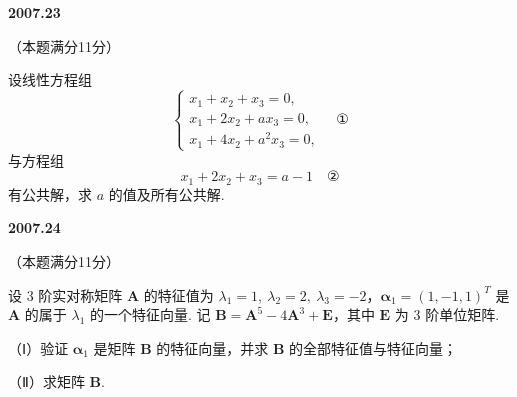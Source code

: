 \documentclass[UTF8,12pt,fontset=windows]{ctexart}
\begin{document}
\vfill
\newpage
{\large\bfseries 2007.23}

（本题满分11分）

设线性方程组
$$\begin{cases} x_1 + x_2 + x_3 = 0, \\ x_1 + 2x_2 + ax_3 = 0, \\ x_1 + 4x_2 + a^2x_3 = 0, \end{cases} \quad \text{①}$$
与方程组
$$x_1 + 2x_2 + x_3 = a - 1 \quad \text{②}$$
有公共解，求 $a$ 的值及所有公共解.

\vfill
\newpage
{\large\bfseries 2007.24}

（本题满分11分）

设 3 阶实对称矩阵 $\boldsymbol{A}$ 的特征值为 $\lambda_1 = 1,\ \lambda_2 = 2,\ \lambda_3 = -2$，$\boldsymbol{\alpha}_1 = (1,-1,1)^T$ 是 $\boldsymbol{A}$ 的属于 $\lambda_1$ 的一个特征向量. 记 $\boldsymbol{B} = \boldsymbol{A}^5 - 4\boldsymbol{A}^3 + \boldsymbol{E}$，其中 $\boldsymbol{E}$ 为 3 阶单位矩阵.

（Ⅰ）验证 $\boldsymbol{\alpha}_1$ 是矩阵 $\boldsymbol{B}$ 的特征向量，并求 $\boldsymbol{B}$ 的全部特征值与特征向量；

（Ⅱ）求矩阵 $\boldsymbol{B}$.

\vfill
\end{document}
